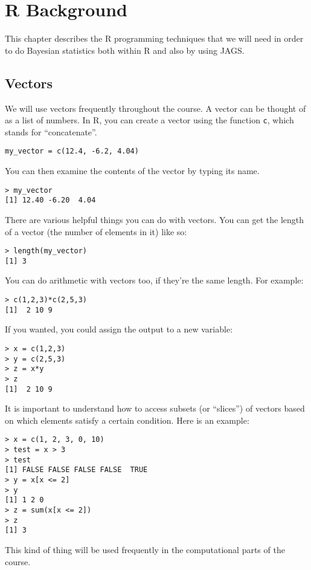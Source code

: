 \chapter{R Background}
This chapter describes the R programming techniques that we will need in order
to do Bayesian statistics both within R and also by using JAGS.

\section{Vectors}
We will use vectors frequently throughout the course. A vector can be thought
of as a list of numbers. In R, you can create a vector using the function
{\tt c}, which stands for ``concatenate''.
\begin{verbatim}
my_vector = c(12.4, -6.2, 4.04)
\end{verbatim}
You can then examine the contents of the vector by typing its name.
\begin{verbatim}
> my_vector
[1] 12.40 -6.20  4.04
\end{verbatim}
There are various helpful things you can do with vectors. You can get the length
of a vector (the number of elements in it) like so:
\begin{verbatim}
> length(my_vector)
[1] 3
\end{verbatim}
You can do arithmetic
with vectors too, if they're the same length. For example:
\begin{verbatim}
> c(1,2,3)*c(2,5,3)
[1]  2 10 9
\end{verbatim}
If you wanted, you could assign the output to a new variable:
\begin{verbatim}
> x = c(1,2,3)
> y = c(2,5,3)
> z = x*y
> z
[1]  2 10 9
\end{verbatim}
It is important to understand how to access subsets (or ``slices'') of vectors
based on which elements satisfy a certain condition. Here is an example:
\begin{verbatim}
> x = c(1, 2, 3, 0, 10)
> test = x > 3
> test
[1] FALSE FALSE FALSE FALSE  TRUE
> y = x[x <= 2]
> y
[1] 1 2 0
> z = sum(x[x <= 2])
> z
[1] 3
\end{verbatim}
This kind of thing will be used frequently in the computational parts of the
course.




